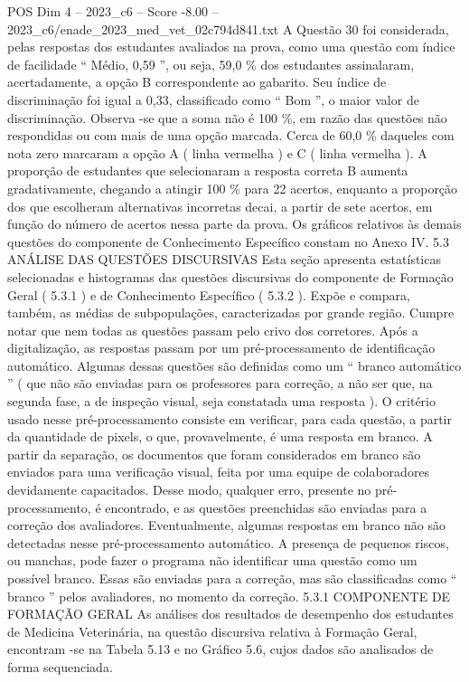 \begin{textsample}{POS Dim 4 – 2023\_c6 – Score -8.00 – 2023\_c6/enade\_2023\_med\_vet\_02c794d841.txt}
A Questão 30 foi considerada, pelas respostas dos estudantes avaliados na prova, como uma questão com índice de facilidade “ Médio, 0,59 ”, ou seja, 59,0 \% dos estudantes assinalaram, acertadamente, a opção B correspondente ao gabarito.
Seu índice de discriminação foi igual a 0,33, classificado como “ Bom ”, o maior valor de discriminação.
Observa -se que a soma não é 100 \%, em razão das questões não respondidas ou com mais de uma opção marcada.
Cerca de 60,0 \% daqueles com nota zero marcaram a opção A ( linha vermelha ) e C ( linha vermelha ).
A proporção de estudantes que selecionaram a resposta correta B aumenta gradativamente, chegando a atingir 100 \% para 22 acertos, enquanto a proporção dos que escolheram alternativas incorretas decai, a partir de sete acertos, em função do número de acertos nessa parte da prova.
Os gráficos relativos às demais questões do componente de Conhecimento Específico constam no Anexo IV. 5.3 ANÁLISE DAS QUESTÕES DISCURSIVAS Esta seção apresenta estatísticas selecionadas e histogramas das questões discursivas do componente de Formação Geral ( 5.3.1 ) e de Conhecimento Específico ( 5.3.2 ).
Expõe e compara, também, as médias de subpopulações, caracterizadas por grande região.
Cumpre notar que nem todas as questões passam pelo crivo dos corretores.
Após a digitalização, as respostas passam por um pré-processamento de identificação automático.
Algumas dessas questões são definidas como um “ branco automático ” ( que não são enviadas para os professores para correção, a não ser que, na segunda fase, a de inspeção visual, seja constatada uma resposta ).
O critério usado nesse pré-processamento consiste em verificar, para cada questão, a partir da quantidade de pixels, o que, provavelmente, é uma resposta em branco.
A partir da separação, os documentos que foram considerados em branco são enviados para uma verificação visual, feita por uma equipe de colaboradores devidamente capacitados.
Desse modo, qualquer erro, presente no pré-processamento, é encontrado, e as questões preenchidas são enviadas para a correção dos avaliadores.
Eventualmente, algumas respostas em branco não são detectadas nesse pré-processamento automático.
A presença de pequenos riscos, ou manchas, pode fazer o programa não identificar uma questão como um possível branco.
Essas são enviadas para a correção, mas são classificadas como “ branco ” pelos avaliadores, no momento da correção. 5.3.1 COMPONENTE DE FORMAÇÃO GERAL As análises dos resultados de desempenho dos estudantes de Medicina Veterinária, na questão discursiva relativa à Formação Geral, encontram -se na Tabela 5.13 e no Gráfico 5.6, cujos dados são analisados de forma sequenciada.

\end{textsample}
